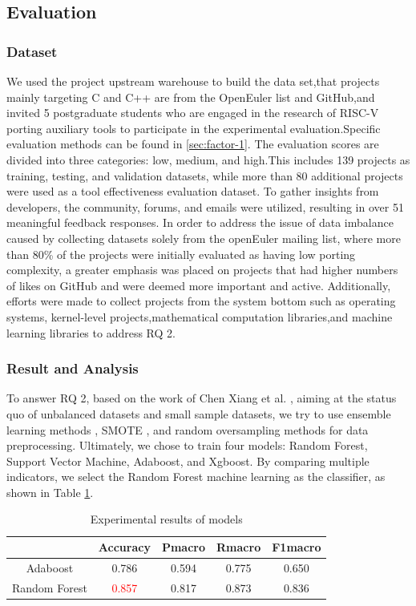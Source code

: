\documentclass[sigconf,screen,review,anonymous]{acmart}
\begin{document}
\subsection{Evaluation}
\subsubsection{Dataset}
We used the project upstream warehouse to build the data set,that projects mainly targeting C and C++ are from the OpenEuler list and GitHub,and invited 5 postgraduate students who are engaged in the research of RISC-V porting auxiliary tools to participate in the experimental evaluation.Specific evaluation methods can be found in \ref{sec:factor-1}. The evaluation scores are divided into three categories: low, medium, and high\citep{githuburl}.This includes 139 projects as training, testing, and validation datasets, while more than 80 additional projects were used as a tool effectiveness evaluation dataset. To gather insights from developers, the community, forums, and emails were utilized, resulting in over 51 meaningful feedback responses. In order to address the issue of data imbalance caused by collecting datasets solely from the openEuler mailing list, where more than 80\% of the projects were initially evaluated as having low porting complexity, a greater emphasis was placed on projects that had higher numbers of likes on GitHub and were deemed more important and active. Additionally, efforts were made to collect projects from the system bottom such as operating systems, kernel-level projects,mathematical computation libraries,and machine learning libraries to address RQ 2.
\subsubsection{Result and Analysis}
To answer RQ 2, based on the work of Chen Xiang et al. \cite{5128907}, aiming at the status quo of unbalanced datasets and small sample datasets, we try to use ensemble learning methods \cite{6509481}, SMOTE \cite{4271036}, and random oversampling methods for data preprocessing.
Ultimately, we chose to train four models: Random Forest, Support Vector Machine, Adaboost, and Xgboost.
By comparing multiple indicators, we select the Random Forest machine learning as the classifier, as shown in Table \ref{tab:evaluation}.

\begin{table}
  \caption{Experimental results of models}
  \label{tab:evaluation}
  \begin{tabular}{ccccc}
    \toprule
     & Accuracy & Pmacro & Rmacro & F1macro \\
    \midrule
    Adaboost & 0.786 & 0.594 & 0.775 & 0.650 \\
    Random Forest & \textcolor{red}{0.857} & 0.817 & 0.873 & 0.836 \\
  \bottomrule
\end{tabular}
\end{table}
\end{document}
